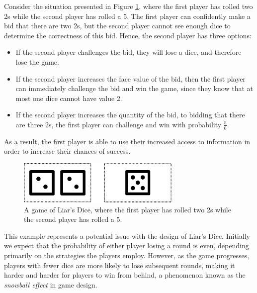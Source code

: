 \begin{example}
\label{cs2:hidden_info_example}

Consider the situation presented in Figure \ref{cs2:uneven_information}, where the first player has rolled two 2s while the second player has rolled a 5. The first player can confidently make a bid that there are two 2s, but the second player cannot see enough dice to determine the correctness of this bid. Hence, the second player has three options:

\begin{itemize}

\item If the second player challenges the bid, they will lose a dice, and therefore lose the game.
\item If the second player increases the face value of the bid, then the first player can immediately challenge the bid and win the game, since they know that at most one dice cannot have value 2.
\item If the second player increases the quantity of the bid, to bidding that there are three 2s, the first player can challenge and win with probability $\frac{5}{6}$.

\end{itemize}

As a result, the first player is able to use their increased access to information in order to increase their chances of success.

\end{example}

\begin{figure}[h]
    \centering
    \includegraphics[width=0.7\textwidth]{images/LiarsDice/different_information.pdf}
    \caption{A game of Liar's Dice, where the first player has rolled two 2s while the second player has rolled a 5.}
    \label{cs2:uneven_information}
\end{figure}

This example represents a potential issue with the design of Liar's Dice. Initially we expect that the probability of either player losing a round is even, depending primarily on the strategies the players employ. However, as the game progresses, players with fewer dice are more likely to lose subsequent rounds, making it harder and harder for players to win from behind, a phenomenon known as the \emph{snowball effect} in game design. 

